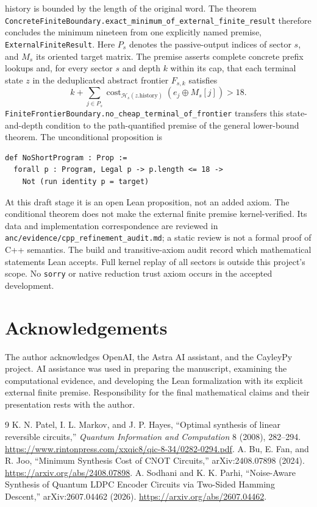 \documentclass[11pt]{article}
\begin{document}
history is bounded by the length of the original word. The theorem
\texttt{ConcreteFiniteBoundary.exact\_minimum\_of\_external\_finite\_result}
therefore concludes the minimum nineteen from one explicitly named premise,
\texttt{ExternalFiniteResult}. Here $P_s$ denotes the passive-output indices of sector $s$, and $M_s$
its oriented target matrix. The premise asserts complete concrete prefix
lookups and, for every sector $s$ and depth $k$ within its cap, that each terminal
state $z$ in the deduplicated abstract frontier $F_{s,k}$ satisfies
\[
  k+\sum_{j\in P_s}\operatorname{cost}_{\mathcal H_s(z.\mathrm{history})}
       (e_j\oplus M_s[j])>18.
\]
\texttt{FiniteFrontierBoundary.no\_cheap\_terminal\_of\_frontier}
transfers this state-and-depth condition to the path-quantified premise
of the general lower-bound theorem. The unconditional proposition is
\begin{lstlisting}[numbers=none]
def NoShortProgram : Prop :=
  forall p : Program, Legal p -> p.length <= 18 ->
    Not (run identity p = target)
\end{lstlisting}
At this draft stage it is an open Lean proposition, not an added axiom.
The conditional theorem does not make the external finite premise
kernel-verified. Its data and implementation correspondence are reviewed
in \texttt{anc/evidence/cpp\_refinement\_audit.md}; a static review is not a
formal proof of C++ semantics. The build and transitive-axiom audit record
which mathematical statements Lean accepts. Full kernel replay of all
sectors is outside this project's scope. No \texttt{sorry} or native
reduction trust axiom occurs in the accepted development.

\section*{Acknowledgements}
The author acknowledges OpenAI, the Astra AI assistant, and the CayleyPy
project. AI assistance was used in preparing the manuscript, examining the
computational evidence, and developing the Lean formalization with its explicit external finite premise.
Responsibility for the final mathematical claims and their presentation
rests with the author.

\begin{thebibliography}{9}
 K. N. Patel, I. L. Markov, and J. P. Hayes,
``Optimal synthesis of linear reversible circuits,''
\emph{Quantum Information and Computation} 8 (2008), 282--294.
\url{https://www.rintonpress.com/xxqic8/qic-8-34/0282-0294.pdf}.
 A. Bu, E. Fan, and R. Joo,
``Minimum Synthesis Cost of CNOT Circuits,'' arXiv:2408.07898 (2024).
\url{https://arxiv.org/abs/2408.07898}.
 A. Sodhani and K. K. Parhi,
``Noise-Aware Synthesis of Quantum LDPC Encoder Circuits via Two-Sided
Hamming Descent,'' arXiv:2607.04462 (2026).
\url{https://arxiv.org/abs/2607.04462}.
\end{thebibliography}
\end{document}
